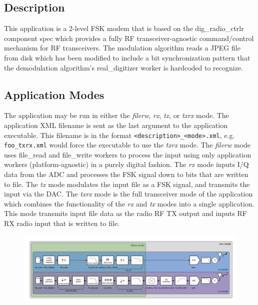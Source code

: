 \tableofcontents

\listoffigures

\begin{landscape}

  \section{Description}

    This application is a 2-level FSK modem that is based on the dig\_radio\_ctrlr
    component spec
    which provides a fully RF transceiver-agnostic command/control mechanism for RF
    transceivers.
    The modulation algorithm reads a JPEG file from disk which has been modified to
    include a bit synchronization pattern that the demodulation algorithm's
    real\_digitizer
    worker is hardcoded to
    recognize.

    \subsection{Application Modes}

      The application may be run in either the \textit{filerw}, \textit{rx},
      \textit{tx}, or \textit{txrx} mode.
      The application XML filename is sent as the last argument to the
      application executable. This filename is in the format
      \texttt{<description>\_<mode>.xml}, e.g. \texttt{foo\_txrx.xml} would force
      the executable to use the
      \textit{txrx} mode.
      The \textit{filerw} mode uses file\_read and file\_write workers to
      process the input using only application workers (platform-agnostic) in a
      purely digital fashion.
      The \textit{rx} mode inputs I/Q data from the ADC and processes the FSK
      signal down to bits that are written to file.
      The \textit{tx} mode modulates the input file as a FSK signal, and
      transmits the input via the DAC.
      The \textit{txrx} mode is the full transceiver mode of the application
      which combines the functionality of the \textit{rx} and \textit{tx} modes
      into a single application. This mode transmits input file data as the
      radio RF TX output and inputs RF RX radio input that is written to file.

      {\centering

      \begin{figure}[htpb]
        \centering
        \captionsetup{type=figure}\includegraphics[scale=0.47]{fsk_app_diagram}
        \label{fig:app_diagram}
      \end{figure}}


\end{landscape}
